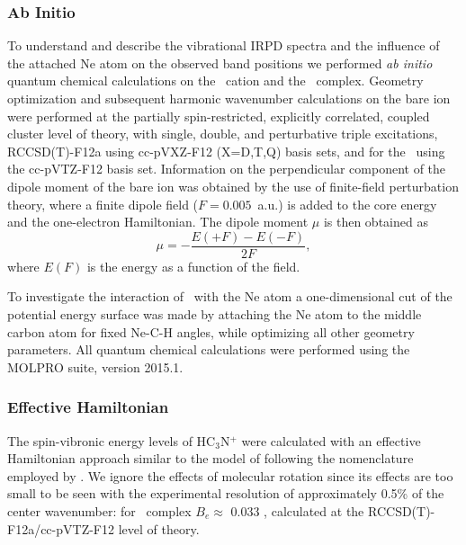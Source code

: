 \subsubsection{Ab Initio}
To understand and describe the vibrational IRPD spectra and the influence of the attached Ne atom on the observed band positions we performed \emph{ab initio} quantum chemical calculations on the \ion\ cation and the \neion\ complex. 
Geometry optimization and subsequent harmonic wavenumber calculations on the bare ion were performed at the partially spin-restricted, explicitly correlated, coupled cluster level of theory, with single, double, and perturbative triple excitations, RCCSD(T)-F12a \cite{Kong2012ExplicitlyStructure} using cc-pVXZ-F12 (X=D,T,Q) \cite{Peterson2008SystematicallyIN} basis sets, and for the \neion\ using the cc-pVTZ-F12 basis set. 
Information on the perpendicular component of the dipole moment of the bare ion was obtained by the use of finite-field perturbation theory, where a finite dipole field ($F=0.005$~a.u.) is added to the core energy and the one-electron Hamiltonian. The dipole moment $\mu$ is then obtained as
\begin{equation}
\label{eq:dipole}
    \mu=-\frac{E(+F) - E(-F)}{2F},
\end{equation}
where $E(F)$ is the energy as a function of the field.

To investigate the interaction of \ion\ with the Ne atom a one-dimensional cut of the potential energy surface was made by attaching the Ne atom to the middle carbon atom for fixed Ne-C-H angles, while optimizing all other geometry parameters. 
All quantum chemical calculations were performed using the MOLPRO suite, version 2015.1.\cite{Werner2020ThePackage}

\subsubsection{Effective Hamiltonian}
The spin-vibronic energy levels of HC$_3$N$^+$ were calculated with an effective Hamiltonian approach similar to the model of \citet{He2005} following the nomenclature employed by \citet{Dai2015TheCalculations}.
We ignore the effects of molecular rotation since its effects are too small to be seen with the experimental resolution of approximately 0.5\% of the center wavenumber: for \neion\ complex $B_e \approx $  0.033 \wn, calculated at the RCCSD(T)-F12a/cc-pVTZ-F12 level of theory. 

